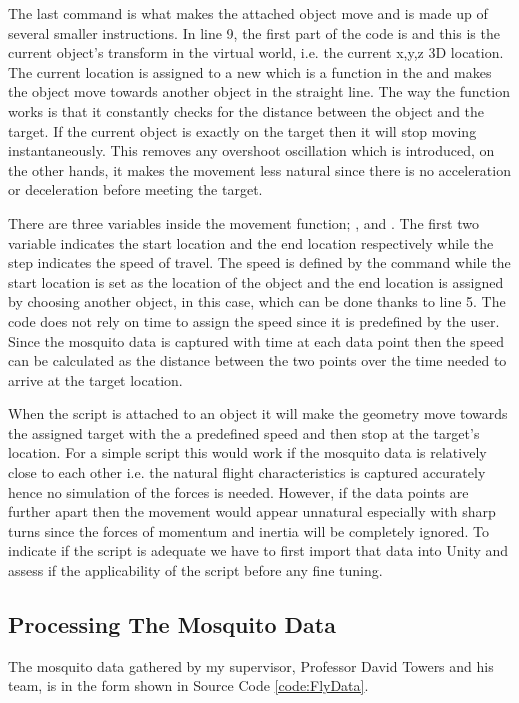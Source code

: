 The last command is what makes the attached object move and is made up of several smaller instructions. In line 9, the first part of the code is  and this is the current object's transform in the virtual world, i.e. the current x,y,z 3D location. The current location is assigned to a new  which is a function in the  and makes the object move towards another object in the straight line. The way the function works is that it constantly checks for the distance between the object and the target. If the current object is exactly on the target then it will stop moving instantaneously. This removes any overshoot oscillation which is introduced, on the other hands, it makes the movement less natural since there is no acceleration or deceleration before meeting the target.

There are three variables inside the movement function; ,  and . The first two variable indicates the start location and the end location respectively while the step indicates the speed of travel. The speed is defined by the  command while the start location is set as the location of the object and the end location is assigned by choosing another object, in this case, which can be done thanks to line 5. The code does not rely on time to assign the speed since it is predefined by the user. Since the mosquito data is captured with time at each data point then the speed can be calculated as the distance between the two points over the time needed to arrive at the target location.

When the script is attached to an object it will make the geometry move towards the assigned target with the a predefined speed and then stop at the target's location. For a simple script this would work if the mosquito data is relatively close to each other i.e. the natural flight characteristics is captured accurately hence no simulation of the forces is needed. However, if the data points are further apart then the movement would appear unnatural especially with sharp turns since the forces of momentum and inertia will be completely ignored. To indicate if the script is adequate we have to first import that data into Unity and assess if the applicability of the script before any fine tuning.



\subsection{Processing The Mosquito Data}
The mosquito data gathered by my supervisor, Professor David Towers and his team, is in the form shown in Source Code \ref{code:FlyData}.

